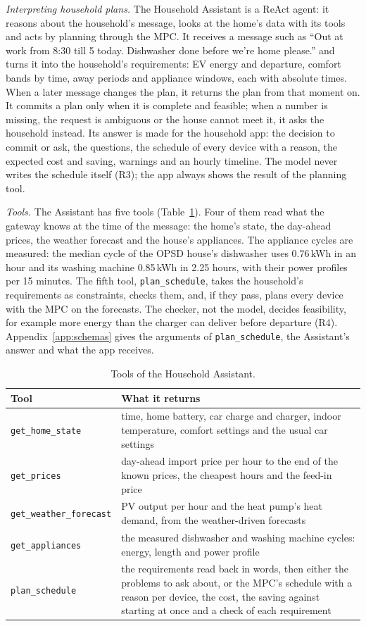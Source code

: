 \documentclass[12pt,a4paper]{report}
\begin{document}
\textit{Interpreting household plans.} The Household Assistant is a
ReAct agent: it reasons about the household's message, looks at the
home's data with its tools and acts by planning through the MPC. It
receives a message such as ``Out at work from 8:30 till 5 today.
Dishwasher done before we're home please.'' and turns it into the
household's requirements: EV energy and departure, comfort bands by
time, away periods and appliance windows, each with absolute times.
When a later message changes the plan, it returns the plan from that
moment on. It commits a plan only when it is complete and feasible;
when a number is missing, the request is ambiguous or the house cannot
meet it, it asks the household instead. Its answer is made for the
household app: the decision to commit or ask, the questions, the
schedule of every device with a reason, the expected cost and saving,
warnings and an hourly timeline. The model never writes the schedule
itself (R3); the app always shows the result of the planning tool.

\textit{Tools.} The Assistant has five tools
(Table~\ref{tab:reacttools}). Four of them read what the gateway knows
at the time of the message: the home's state, the day-ahead prices, the
weather forecast and the house's appliances. The appliance cycles are
measured: the median cycle of the OPSD house's dishwasher uses
0.76\,kWh in an hour and its washing machine 0.85\,kWh in 2.25 hours,
with their power profiles per 15 minutes. The fifth tool,
\texttt{plan\_schedule}, takes the household's requirements as
constraints, checks them, and, if they pass, plans every device with
the MPC on the forecasts. The checker, not the model, decides
feasibility, for example more energy than the charger can deliver
before departure (R4). Appendix~\ref{app:schemas} gives the arguments
of \texttt{plan\_schedule}, the Assistant's answer and what the app
receives.

\begin{table}[htbp]
\caption{Tools of the Household Assistant.}
\label{tab:reacttools}
\small
\begin{tabularx}{\textwidth}{@{}>{\raggedright\arraybackslash}p{4.4cm}X@{}}
\toprule
Tool & What it returns \\
\midrule
\texttt{get\_home\_state} & time, home battery, car charge and charger, indoor temperature, comfort settings and the usual car settings \\
\texttt{get\_prices} & day-ahead import price per hour to the end of the known prices, the cheapest hours and the feed-in price \\
\texttt{get\_weather\_forecast} & PV output per hour and the heat pump's heat demand, from the weather-driven forecasts \\
\texttt{get\_appliances} & the measured dishwasher and washing machine cycles: energy, length and power profile \\
\texttt{plan\_schedule} & the requirements read back in words, then either the problems to ask about, or the MPC's schedule with a reason per device, the cost, the saving against starting at once and a check of each requirement \\
\bottomrule
\end{tabularx}
\end{table}
\end{document}
